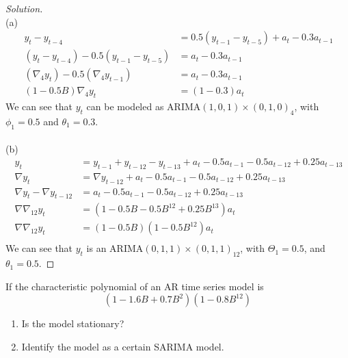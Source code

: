 \documentclass[UTF8,a4paper,14pt]{ctexart}
\newenvironment{solution}
  {\renewcommand\qedsymbol{$\blacksquare$}\begin{proof}[Solution]}
  {\end{proof}}
\theoremstyle{definition}
\theoremstyle{remark}
\begin{document}
\begin{solution}\,\\
  (a)
  \begin{equation}\
    \begin{aligned}
      y_t - y_{t-4} &= 0.5(y_{t-1}-y_{t-5}) + a_t - 0.3a_{t-1}\\
      (y_t - y_{t-4}) - 0.5(y_{t-1}-y_{t-5}) &=  a_t - 0.3a_{t-1}\\
      (\nabla_4 y_t ) - 0.5(\nabla_4 y_{t-1}) &=  a_t - 0.3a_{t-1}\\
      (1-0.5B)\nabla_4 y_t &= (1-0.3)a_t
    \end{aligned}
  \end{equation}
  We can see that \(y_t\) can be modeled as ARIMA\((1,0,1)\times(0,1,0)_4\), with \(\phi_1 = 0.5\) and \(\theta_1 = 0.3\).\\
  \\
  (b)
  \begin{equation}\
    \begin{aligned}
      y_t &= y_{t-1}+y_{t-12}-y_{t-13}+a_t-0.5a_{t-1}-0.5a_{t-12}+0.25a_{t-13}\\
      \nabla y_t &= \nabla  y_{t-12} + a_t-0.5a_{t-1}-0.5a_{t-12}+0.25a_{t-13}\\
      \nabla y_t - \nabla  y_{t-12} &= a_t-0.5a_{t-1}-0.5a_{t-12}+0.25a_{t-13}\\
      \nabla\nabla_{12} y_t &=  (1-0.5B-0.5B^{12}+0.25B^{13})a_t\\
      \nabla\nabla_{12} y_t &=  (1-0.5B)(1-0.5B^{12})a_t\\
    \end{aligned}
  \end{equation}
  We can see that \(y_t\) is an ARIMA\((0,1,1)\times(0,1,1)_{12}\), with \(\Theta_1 = 0.5\), and \(\theta_1 = 0.5\).
\end{solution}


\begin{Problem}{}
  If the characteristic polynomial of an AR time series model is
  \[(1-1.6B+0.7B^2)(1-0.8B^{12})\]
\begin{enumerate}[label=(\alph*)]
  \item Is the model stationary?
  \item Identify the model as a certain SARIMA model.
  \end{enumerate}
\end{Problem}
\end{document}
